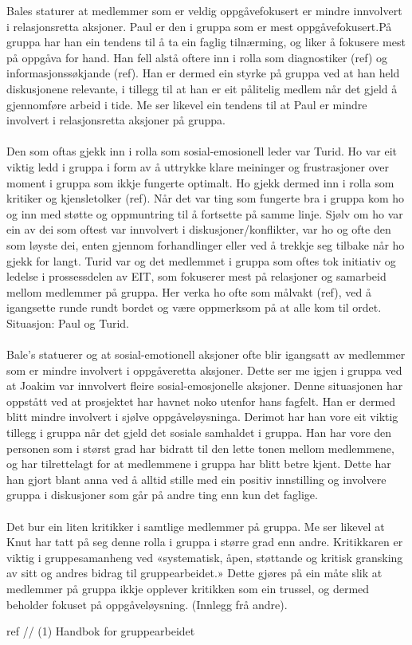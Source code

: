 Bales staturer at medlemmer som er veldig oppgåvefokusert er mindre innvolvert i relasjonsretta aksjoner. Paul er den i gruppa som er mest oppgåvefokusert.På gruppa har han ein tendens til å ta ein faglig tilnærming, og liker å fokusere mest på oppgåva for hand. Han fell alstå oftere inn i rolla som diagnostiker (ref) og informasjonssøkjande (ref). Han er dermed ein styrke på gruppa ved at han held diskusjonene relevante, i tillegg til at han er eit pålitelig medlem når det gjeld å gjennomføre arbeid i tide. Me ser likevel ein tendens til at Paul er mindre involvert i relasjonsretta aksjoner på gruppa. 
\\
\\
Den som oftas gjekk inn i rolla som sosial-emosionell leder var Turid. Ho var eit viktig ledd i gruppa i form av å uttrykke klare meininger og frustrasjoner over moment i gruppa som ikkje fungerte optimalt. Ho gjekk dermed inn i rolla som kritiker og kjensletolker (ref). Når det var ting som fungerte bra i gruppa kom ho og inn med støtte og oppmuntring til å fortsette på samme linje. Sjølv om ho var ein av dei som oftest var innvolvert i diskusjoner/konflikter, var ho og ofte den som løyste dei, enten gjennom forhandlinger eller ved å trekkje seg tilbake når ho gjekk for langt. Turid var og det medlemmet i gruppa som oftes tok initiativ og ledelse i prossessdelen av EIT, som fokuserer mest på relasjoner og samarbeid mellom medlemmer på gruppa. Her verka ho ofte som målvakt (ref), ved å igangsette runde rundt bordet og være oppmerksom på at alle kom til ordet.
Situasjon: Paul og Turid.
\\
\\
Bale's statuerer og at sosial-emotionell aksjoner ofte blir igangsatt av medlemmer som er mindre involvert i oppgåveretta aksjoner. Dette ser me igjen i gruppa ved at Joakim var innvolvert fleire sosial-emosjonelle aksjoner. Denne situasjonen har oppstått ved at prosjektet har havnet noko utenfor hans fagfelt. Han er dermed blitt mindre involvert i sjølve oppgåveløysninga. Derimot har han vore eit viktig tillegg i gruppa når det gjeld det sosiale samhaldet i gruppa. Han har vore den personen som i størst grad har bidratt til den lette tonen mellom medlemmene, og har tilrettelagt for at medlemmene i gruppa har blitt betre kjent. Dette har han gjort blant anna ved å alltid stille med ein positiv innstilling og involvere gruppa i diskusjoner som går på andre ting enn kun det faglige.
\\
\\
Det bur ein liten kritikker i samtlige medlemmer på gruppa. Me ser likevel at Knut har tatt på seg denne rolla i gruppa i større grad enn andre. Kritikkaren er viktig i gruppesamanheng ved «systematisk, åpen, støttande og kritisk gransking av sitt og andres bidrag til gruppearbeidet.»
Dette gjøres på ein måte slik at medlemmer på gruppa ikkje opplever kritikken som ein trussel, og dermed beholder fokuset på oppgåveløysning. (Innlegg frå andre).

ref // (1) Handbok for gruppearbeidet